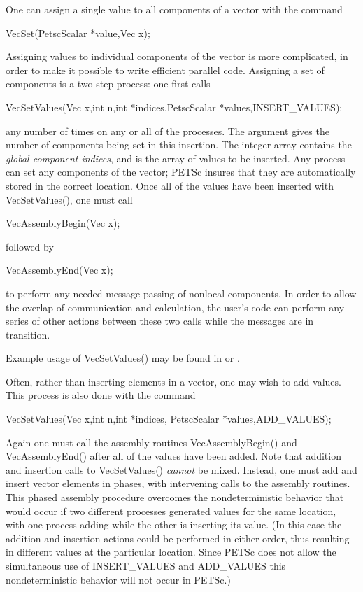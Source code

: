 One can assign a single value to all components of a vector with the 
command 
\begin{tabbing}
  VecSet(PetscScalar *value,Vec x);
\end{tabbing}
Assigning values to individual components of the vector is more 
complicated, in order to make it possible to write efficient parallel 
code.  Assigning a set of components is a two-step process: one 
first calls   
\begin{tabbing}
  VecSetValues(Vec x,int n,int *indices,PetscScalar *values,INSERT\_VALUES);
\end{tabbing}
any number of times on any or all of the processes. The argument
 gives the number of components being set in this 
insertion. The integer array  contains the {\em global component
indices}, and  is the array of values to be inserted.
Any process can set any components of the vector; PETSc insures that 
they are automatically stored in the correct location.
Once all of the values have been inserted with VecSetValues(),
one must call 
\begin{tabbing}
  VecAssemblyBegin(Vec x);
\end{tabbing}
followed by  
\begin{tabbing}
  VecAssemblyEnd(Vec x);
\end{tabbing}
to perform any needed message passing of nonlocal components.
In order to allow the overlap of communication and calculation,
the user's code can perform any series of other actions between these 
two calls while the messages are in transition. 

Example usage of VecSetValues() may be found in 
 or .

Often, rather than inserting elements in a vector, one may wish to 
add values. This process 
is also done with the command 
\begin{tabbing}
  VecSetValues(Vec x,int n,int *indices, PetscScalar *values,ADD\_VALUES);
\end{tabbing}
Again  one must call the assembly routines 
VecAssemblyBegin() and VecAssemblyEnd() after all of the values
have been added.  Note that addition and insertion calls to 
VecSetValues() {\em cannot} be mixed.  Instead, one must add and insert
vector elements in phases, with intervening calls to the assembly
routines. This phased assembly procedure overcomes the nondeterministic
behavior that
would occur if two different processes generated values
for the same location, with one process adding while the other is inserting
its value.  (In this case the addition and insertion actions could be performed 
in either order,
thus resulting in different values at the particular location. Since
PETSc does not allow the simultaneous use of INSERT\_VALUES and
ADD\_VALUES this nondeterministic behavior will not occur in PETSc.)

